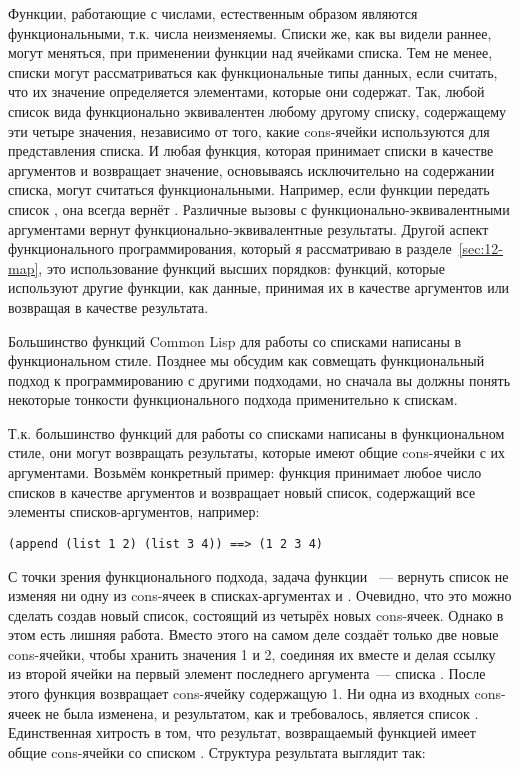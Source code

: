 Функции, работающие с числами, естественным образом являются функциональными, т.к. числа
неизменяемы. Списки же, как вы видели раннее, могут меняться, при применении функции
 над ячейками списка. Тем не менее, списки могут рассматриваться как
функциональные типы данных, если считать, что их значение определяется элементами, которые
они содержат. Так, любой список вида  функционально эквивалентен любому
другому списку, содержащему эти четыре значения, независимо от того, какие cons-ячейки
используются для представления списка. И любая функция, которая принимает списки в
качестве аргументов и возвращает значение, основываясь исключительно на содержании списка,
могут считаться функциональными. Например, если функции  передать список
, она всегда вернёт . Различные вызовы  с
функционально-эквивалентными аргументами вернут функционально-эквивалентные
результаты. Другой аспект функционального программирования, который я рассматриваю в
разделе~\ref{sec:12-map}, это использование функций высших порядков: функций, которые
используют другие функции, как данные, принимая их в качестве аргументов или возвращая в
качестве результата.

Большинство функций Common Lisp для работы со списками написаны в функциональном
стиле. Позднее мы обсудим как совмещать функциональный подход к программированию с другими
подходами, но сначала вы должны понять некоторые тонкости функционального подхода
применительно к спискам.

Т.к. большинство функций для работы со списками написаны в функциональном стиле, они могут
возвращать результаты, которые имеют общие cons-ячейки с их аргументами. Возьмём
конкретный пример: функция  принимает любое число списков в качестве
аргументов и возвращает новый список, содержащий все элементы списков-аргументов,
например:

\begin{lstlisting}
(append (list 1 2) (list 3 4)) ==> (1 2 3 4)
\end{lstlisting}

С точки зрения функционального подхода, задача функции ~--- вернуть список
 не изменяя ни одну из cons-ячеек в списках-аргументах  и
. Очевидно, что это можно сделать создав новый список, состоящий из четырёх
новых cons-ячеек. Однако в этом есть лишняя работа. Вместо этого  на самом
деле создаёт только две новые cons-ячейки, чтобы хранить значения 1 и 2, соединяя их
вместе и делая ссылку из  второй ячейки на первый элемент последнего аргумента~---
списка . После этого функция возвращает cons-ячейку содержащую 1. Ни одна из
входных cons-ячеек не была изменена, и результатом, как и требовалось, является список
. Единственная хитрость в том, что результат, возвращаемый функцией
 имеет общие cons-ячейки со списком . Структура результата
выглядит так:

